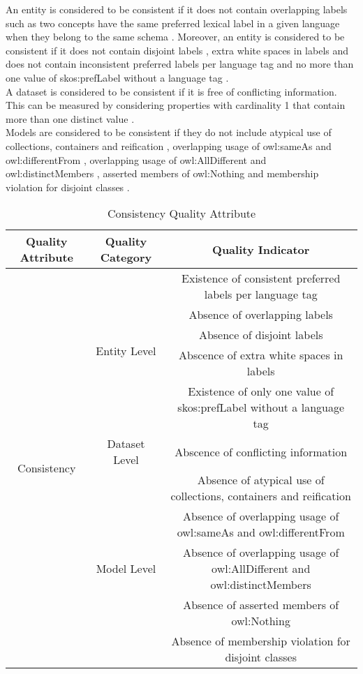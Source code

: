 \documentclass[onecolumn, crcready]{iosart2c}
\begin{document}
An entity is considered to be consistent if it does not contain overlapping labels such as two concepts have the same preferred lexical label in a given language when they belong to the same schema \cite{skosprimer}\cite{Mader2012}. Moreover, an entity is considered to be consistent if it does not contain disjoint labels \cite{Mader2012}, extra white spaces in labels\cite{Suominen:2012:IQS:2413941.2413985} and does not contain inconsistent preferred labels per language tag and no more than one value of skos:prefLabel without a language tag \cite{Mader2012}\cite{Suominen:2012:IQS:2413941.2413985}.\\ A dataset is considered to be consistent if it is free of conflicting information. This can be measured by considering properties with cardinality 1 that contain more than one distinct value \cite{Mendes2012}.\\ Models are considered to be consistent if they do not include atypical use of collections, containers and reification \cite{Hogan2010}, overlapping usage of owl:sameAs and owl:differentFrom \cite{Hogan2010}, overlapping usage of owl:AllDifferent and owl:distinctMembers \cite{Hogan2010}, asserted members of owl:Nothing and membership violation for disjoint classes \cite{Hogan2010}.
\begin{table}[h]
\begin{tabular}{|c|c|c|}
\hline 
Quality Attribute & Quality Category & Quality Indicator\tabularnewline
\hline 
\hline 
\multirow{11}{*}{Consistency} & \multirow{5}{*}{Entity Level} & Existence of consistent preferred labels per language tag\tabularnewline
\cline{3-3} 
 &  & Absence of overlapping labels\tabularnewline
\cline{3-3} 
 &  & Absence of disjoint labels\tabularnewline
\cline{3-3} 
 &  & Abscence of extra white spaces in labels\tabularnewline
\cline{3-3} 
 &  & Existence of only one value of skos:prefLabel without a language tag\tabularnewline
\cline{2-3} 
 & \multirow{1}{*}{Dataset Level} & Abscence of conflicting information\tabularnewline
\cline{2-3} 
 & \multirow{5}{*}{Model Level} & Absence of atypical use of collections, containers and reification\tabularnewline
\cline{3-3} 
 &  & Absence of overlapping usage of owl:sameAs and owl:differentFrom\tabularnewline
\cline{3-3} 
 &  & Absence of overlapping usage of owl:AllDifferent and owl:distinctMembers\tabularnewline
\cline{3-3} 
 &  & Absence of asserted members of owl:Nothing\tabularnewline
\cline{3-3} 
 &  & Absence of membership violation for disjoint classes\tabularnewline
\hline 
\end{tabular}\caption{Consistency Quality Attribute}
\end{table}
\end{document}
